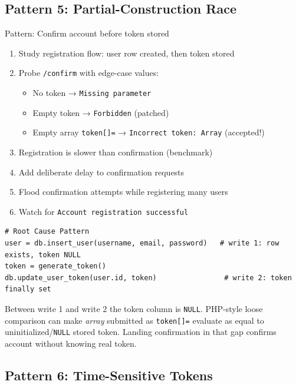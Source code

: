 \documentclass[11pt]{article}
\begin{document}
\subsection{Pattern 5: Partial-Construction Race}

\begin{labbox}{Pattern: Confirm account before token stored}
\begin{enumerate}
    \item Study registration flow: user row created, then token stored
    \item Probe \texttt{/confirm} with edge-case values:
    \begin{itemize}
        \item No token → \texttt{Missing parameter}
        \item Empty token → \texttt{Forbidden} (patched)
        \item Empty array \texttt{token[]=} → \texttt{Incorrect token: Array} (accepted!)
    \end{itemize}
    \item Registration is slower than confirmation (benchmark)
    \item Add deliberate delay to confirmation requests
    \item Flood confirmation attempts while registering many users
    \item Watch for \texttt{Account registration successful}
\end{enumerate}
\end{labbox}

\begin{lstlisting}[style=code]
# Root Cause Pattern
user = db.insert_user(username, email, password)   # write 1: row exists, token NULL
token = generate_token()
db.update_user_token(user.id, token)                # write 2: token finally set
\end{lstlisting}

\begin{causebox}
Between write 1 and write 2 the token column is \texttt{NULL}. PHP-style loose comparison can make \emph{array} submitted as \texttt{token[]=} evaluate as equal to uninitialized/\texttt{NULL} stored token. Landing confirmation in that gap confirms account without knowing real token.
\end{causebox}

\subsection{Pattern 6: Time-Sensitive Tokens}
\end{document}

